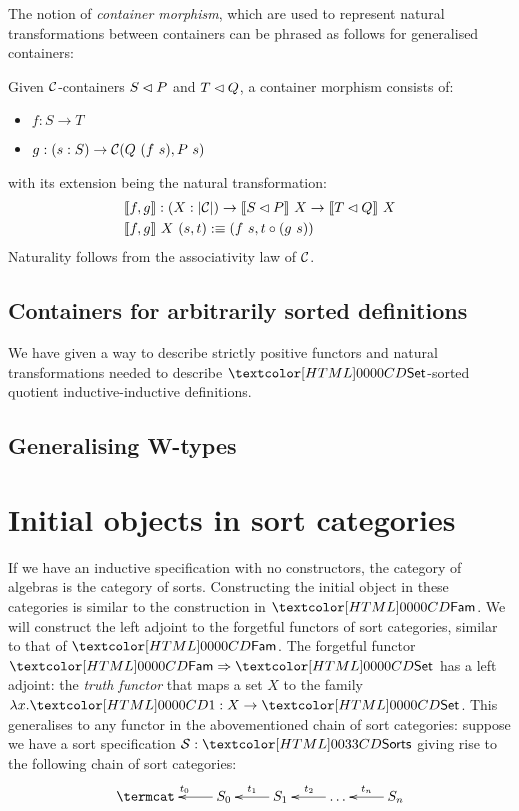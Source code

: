 The notion of \emph{container morphism}, which are used to represent
natural transformations between containers can be phrased as follows
for generalised containers:
\begin{definition}
  Given $\mathcal{C}$-containers $S \lhd P$ and $T \lhd Q$, a container
  morphism consists of:
  \begin{itemize}
  \item $f : S \to T$
  \item $g : (s : S) \to \Cc(Q\ (f\ s), P\ s)$
  \end{itemize}
  with its extension being the natural transformation:
  \begin{align*}
    &\llbracket f , g \rrbracket : (X : | \mathcal{C} |) \to \llbracket S \lhd P \rrbracket\ X \to \llbracket T \lhd Q \rrbracket\ X \\
    &\llbracket f , g \rrbracket\ X\ (s , t) :\equiv (f\ s , t \circ (g\ s))
  \end{align*}
  Naturality follows from the associativity law of $\mathcal{C}$.
\end{definition}


\subsection{Containers for arbitrarily sorted definitions}
We have given a way to describe strictly positive functors and natural
transformations needed to describe $\Set$-sorted quotient
inductive-inductive definitions.


\subsection{Generalising W-types}

\section{Initial objects in sort categories}

If we have an inductive specification with no constructors, the
category of algebras is the category of sorts. Constructing the
initial object in these categories is similar to the construction in
$\Fam$. We will construct the left adjoint to the forgetful functors
of sort categories, similar to that of $\Fam$. The forgetful functor
$\Func{\Fam}{\Set}$ has a left adjoint: the \emph{truth functor} that
maps a set $X$ to the family $\lambda x . \unitty : X \to \Set$. This
generalises to any functor in the abovementioned chain of sort
categories: suppose we have a sort specification $\Ss : \sortsty$
giving rise to the following chain of sort categories:
$$
\xymatrix{
\termcat &S_0 \ar[l]_{t_0} &S_1 \ar[l]_{t_1} &\hdots \ar[l]_{t_2} &S_n \ar[l]_{t_n}
}
$$

